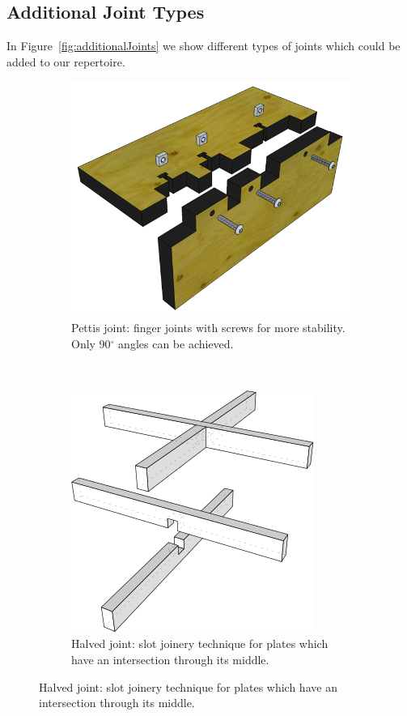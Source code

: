 \documentclass[../ClassicThesis.tex]{subfiles}
\begin{document}
\subsection{Additional Joint Types}
In Figure~\ref{fig:additionalJoints} we show different types of joints which could be added to our repertoire.
\begin{figure}
    \centering
\begin{subfigure}[b]{0.45\textwidth}
    \includegraphics[width=\textwidth]{Images/pettis-joints.png}
    \caption{Pettis joint: finger joints with screws for more stability. Only 90$^\circ$ angles can be achieved.}
    \end{subfigure}
    ~
    \begin{subfigure}[b]{0.45\textwidth}
    \includegraphics[width=\textwidth]{Images/HalvedJoint.png}
    \caption{Halved joint: slot joinery technique for plates which have an intersection through its middle.}
    \end{subfigure}
    

\end{figure}
\end{document}
